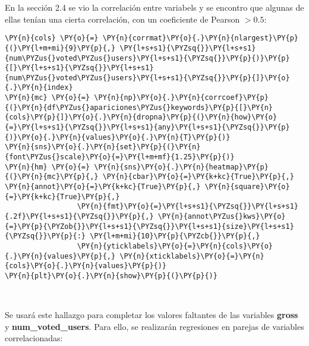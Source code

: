 En la sección 2.4 se vio la correlación entre variabels y se encontro
que algunas de ellas tenían una cierta correlación, con un coeficiente
de Pearson \(>0.5\):

    \begin{tcolorbox}[breakable, size=fbox, boxrule=1pt, pad at break*=1mm,colback=cellbackground, colframe=cellborder]
\begin{Verbatim}[commandchars=\\\{\}]
\PY{n}{cols} \PY{o}{=} \PY{n}{corrmat}\PY{o}{.}\PY{n}{nlargest}\PY{p}{(}\PY{l+m+mi}{9}\PY{p}{,} \PY{l+s+s1}{\PYZsq{}}\PY{l+s+s1}{num\PYZus{}voted\PYZus{}users}\PY{l+s+s1}{\PYZsq{}}\PY{p}{)}\PY{p}{[}\PY{l+s+s1}{\PYZsq{}}\PY{l+s+s1}{num\PYZus{}voted\PYZus{}users}\PY{l+s+s1}{\PYZsq{}}\PY{p}{]}\PY{o}{.}\PY{n}{index}
\PY{n}{mc} \PY{o}{=} \PY{n}{np}\PY{o}{.}\PY{n}{corrcoef}\PY{p}{(}\PY{n}{df\PYZus{}apariciones\PYZus{}keywords}\PY{p}{[}\PY{n}{cols}\PY{p}{]}\PY{o}{.}\PY{n}{dropna}\PY{p}{(}\PY{n}{how}\PY{o}{=}\PY{l+s+s1}{\PYZsq{}}\PY{l+s+s1}{any}\PY{l+s+s1}{\PYZsq{}}\PY{p}{)}\PY{o}{.}\PY{n}{values}\PY{o}{.}\PY{n}{T}\PY{p}{)}
\PY{n}{sns}\PY{o}{.}\PY{n}{set}\PY{p}{(}\PY{n}{font\PYZus{}scale}\PY{o}{=}\PY{l+m+mf}{1.25}\PY{p}{)}
\PY{n}{hm} \PY{o}{=} \PY{n}{sns}\PY{o}{.}\PY{n}{heatmap}\PY{p}{(}\PY{n}{mc}\PY{p}{,} \PY{n}{cbar}\PY{o}{=}\PY{k+kc}{True}\PY{p}{,} \PY{n}{annot}\PY{o}{=}\PY{k+kc}{True}\PY{p}{,} \PY{n}{square}\PY{o}{=}\PY{k+kc}{True}\PY{p}{,}
                 \PY{n}{fmt}\PY{o}{=}\PY{l+s+s1}{\PYZsq{}}\PY{l+s+s1}{.2f}\PY{l+s+s1}{\PYZsq{}}\PY{p}{,} \PY{n}{annot\PYZus{}kws}\PY{o}{=}\PY{p}{\PYZob{}}\PY{l+s+s1}{\PYZsq{}}\PY{l+s+s1}{size}\PY{l+s+s1}{\PYZsq{}}\PY{p}{:} \PY{l+m+mi}{10}\PY{p}{\PYZcb{}}\PY{p}{,} 
                 \PY{n}{yticklabels}\PY{o}{=}\PY{n}{cols}\PY{o}{.}\PY{n}{values}\PY{p}{,} \PY{n}{xticklabels}\PY{o}{=}\PY{n}{cols}\PY{o}{.}\PY{n}{values}\PY{p}{)}
\PY{n}{plt}\PY{o}{.}\PY{n}{show}\PY{p}{(}\PY{p}{)}
\end{Verbatim}
\end{tcolorbox}

    \begin{center}
    \end{center}
    { \hspace*{\fill} \\}
    
    Se usará este hallazgo para completar los valores faltantes de las
variables \textbf{gross} y \textbf{num\_voted\_users}. Para ello, se
realizarán regresiones en parejas de variables correlacionadas:

